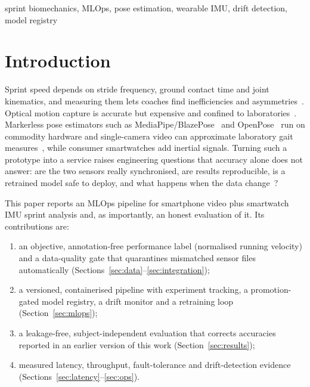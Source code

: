 \documentclass[conference]{IEEEtran}
\begin{document}
\begin{IEEEkeywords}
sprint biomechanics, MLOps, pose estimation, wearable IMU, drift detection, model registry
\end{IEEEkeywords}

\section{Introduction}
Sprint speed depends on stride frequency, ground contact time and joint kinematics, and measuring them lets coaches find inefficiencies and asymmetries~\cite{weyand2000}. Optical motion capture is accurate but expensive and confined to laboratories~\cite{colyer2018}. Markerless pose estimators such as MediaPipe/BlazePose~\cite{bazarevsky2020} and OpenPose~\cite{cao2021} run on commodity hardware and single-camera video can approximate laboratory gait measures~\cite{kidzinski2020}, while consumer smartwatches add inertial signals. Turning such a prototype into a service raises engineering questions that accuracy alone does not answer: are the two sensors really synchronised, are results reproducible, is a retrained model safe to deploy, and what happens when the data change~\cite{sculley2015}?

This paper reports an MLOps pipeline for smartphone video plus smartwatch IMU sprint analysis and, as importantly, an honest evaluation of it. Its contributions are:
\begin{enumerate}
\item an objective, annotation-free performance label (normalised running velocity) and a data-quality gate that quarantines mismatched sensor files automatically (Sections~\ref{sec:data}--\ref{sec:integration});
\item a versioned, containerised pipeline with experiment tracking, a promotion-gated model registry, a drift monitor and a retraining loop (Section~\ref{sec:mlops});
\item a leakage-free, subject-independent evaluation that corrects accuracies reported in an earlier version of this work (Section~\ref{sec:results});
\item measured latency, throughput, fault-tolerance and drift-detection evidence (Sections~\ref{sec:latency}--\ref{sec:ops}).
\end{enumerate}
\end{document}
